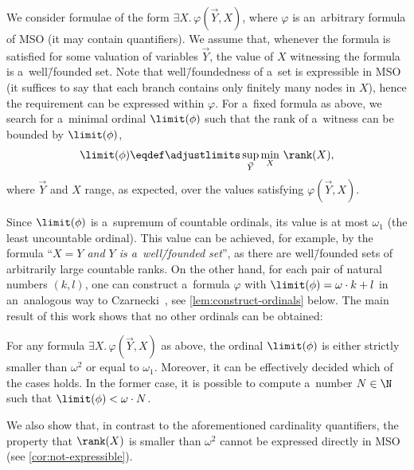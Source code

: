\documentclass{lmcs}
\numberwithin{equation}{section}
\numberwithin{figure}{section}
\begin{document}
We consider formulae of the form $\exists X.\, \varphi(\vec{Y}, X)$, where $\varphi$ is an~arbitrary formula of MSO (it may contain quantifiers).
We assume that, whenever the formula is satisfied for some valuation of variables $\vec{Y}$, the value of $X$ witnessing the formula is a~well\=/founded set.
Note that well\=/foundedness of a~set is expressible in MSO (it suffices to say that each branch contains only finitely many nodes in $X$),
hence the requirement can be expressed within $\varphi$.
For a~fixed formula as above, we search for a~minimal ordinal $\limit(\phi)$ such that the rank of a~witness can be bounded by $\limit(\phi)$,
\begin{equation}\label{eq:eta-for-phi}
	\limit(\phi) \eqdef\adjustlimits\sup_{\vec{Y}}\min_{X}\, \rank(X),
\end{equation}
where $\vec{Y}$ and $X$ range, as expected, over the values satisfying $\varphi(\vec{Y}, X)$.

Since $\limit(\phi)$ is a~supremum of countable ordinals, its value is at most $\omega_1$ (the least uncountable ordinal).
This value can be achieved, for example, by the formula ``\emph{$X = Y$ and $Y$ is a~well\=/founded set}'',
as there are well\=/founded sets of arbitrarily large countable ranks.
On the other hand, for each pair of natural numbers $(k,l)$, one can construct a~formula $\varphi$ with $\limit(\phi) = \omega\cdot k+l$
in an~analogous way to Czarnecki~\cite{czarnecki_closure_fics}, see \cref{lem:construct-ordinals} below.
The main result of this work shows that no other ordinals can be obtained:

\begin{thm}\label{thm:main}
	For any formula $\exists X.\, \varphi(\vec{Y}, X)$ as above, the ordinal $\limit(\phi)$ is either strictly smaller than $\omega^2$ or equal to $\omega_1$.
	Moreover, it can be effectively decided which of the cases holds.
	In the former case, it is possible to compute a~number $N\in\N$ such that $\limit(\phi)< \omega\cdot N$.
\end{thm}
\noindent %
We also show that, in contrast to the aforementioned cardinality quantifiers, the property that $\rank(X)$ is smaller than $\omega^2$ cannot be expressed directly in MSO (see \cref{cor:not-expressible}).
\end{document}
